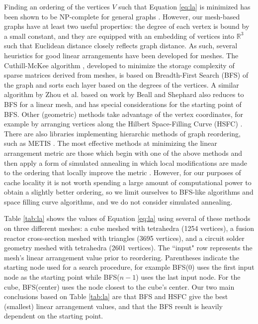 Finding an ordering of the vertices $V$ such that Equation \ref{eq:la}
is minimized has been shown to be NP-complete for general
graphs \cite{garey1976some}.
However, our mesh-based graphs have at least two useful properties:
the degree of each vertex is bound by a small constant,
and they are equipped with an embedding of vertices into $\mathbb{R}^3$
such that Euclidean distance closely reflects graph distance.
As such, several heuristics for good linear arrangements have been developed
for meshes.
The Cuthill-McKee algorithm \cite{cuthill1969reducing},
developed to minimize the storage complexity of sparse matrices
derived from meshes, is based on
Breadth-First Search (BFS) of the graph and sorts each layer based
on the degrees of the vertices.
A similar algorithm by Zhou et al. \cite{zhou2010adjacency} based
on work by Beall and Shephard \cite{beall1997general} also
reduces to BFS for a linear mesh, and has special considerations
for the starting point of BFS.
Other (geometric) methods take advantage of the vertex coordinates,
for example by arranging vertices along the Hilbert Space-Filling Curve
(HSFC) \cite{devine2005new}.
There are also libraries implementing hierarchic methods of
graph reordering, such as METIS \cite{METIS}.
The most effective methods at minimizing the linear arrangement metric
are those which begin with one of the above methods and then apply
a form of simulated annealing in which local modifications are made
to the ordering that locally improve the metric \cite{petit2003experiments}.
However, for our purposes of cache locality it is not worth
spending a large amount of computational power to obtain a slightly
better ordering, so we limit ourselves to BFS-like algorithms and space filling
curve algorithms, and we do not consider simulated annealing.

Table \ref{tab:la} shows the values of Equation \ref{eq:la} using
several of these methods on three different meshes:
a cube meshed with tetrahedra (1254 vertices), a fusion reactor
cross-section meshed with triangles (3695 vertices), and
a circuit solder geometry meshed with tetrahedra (2601 vertices).
The ``input" row represents the mesh's linear arrangement value
prior to reordering.
Parentheses indicate the starting node used for a search procedure,
for example BFS(0) uses the first input node as the starting point
while BFS($n-1$) uses the last input node.
For the cube, BFS(center) uses the node closest to the cube's center.
Our two main conclusions based on Table \ref{tab:la} are that
BFS and HSFC give the best (smallest) linear arrangement values,
and that the BFS result is heavily dependent on the starting point.

